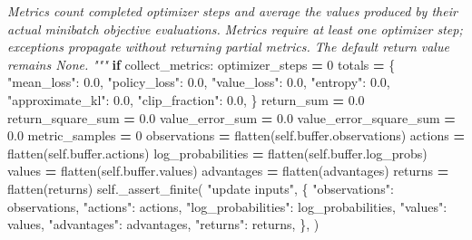 \documentclass[
  american,
  11pt,
  letterpaper,
]{article}
\newenvironment{Shaded}{\begin{snugshade}}{\end{snugshade}}
\newcommand{\BuiltInTok}[1]{#1}
\newcommand{\CommentTok}[1]{\textcolor[rgb]{0.56,0.35,0.01}{\textit{#1}}}
\newcommand{\ControlFlowTok}[1]{\textcolor[rgb]{0.13,0.29,0.53}{\textbf{#1}}}
\newcommand{\DecValTok}[1]{\textcolor[rgb]{0.00,0.00,0.81}{#1}}
\newcommand{\FloatTok}[1]{\textcolor[rgb]{0.00,0.00,0.81}{#1}}
\newcommand{\NormalTok}[1]{#1}
\newcommand{\OperatorTok}[1]{\textcolor[rgb]{0.81,0.36,0.00}{\textbf{#1}}}
\newcommand{\StringTok}[1]{\textcolor[rgb]{0.31,0.60,0.02}{#1}}
\newcommand{\VariableTok}[1]{\textcolor[rgb]{0.00,0.00,0.00}{#1}}
\renewenvironment{Shaded}{\par\smallskip}{\par\smallskip}
\begin{document}
\begin{Shaded}
\begin{Highlighting}[]
\CommentTok{        Metrics count completed optimizer steps and average the values produced}
\CommentTok{        by their actual minibatch objective evaluations.}
\CommentTok{        Metrics require at least one optimizer step; exceptions propagate without}
\CommentTok{        returning partial metrics. The default return value remains \textasciigrave{}\textasciigrave{}None\textasciigrave{}\textasciigrave{}.}
\CommentTok{        """}
        \ControlFlowTok{if}\NormalTok{ collect\_metrics:}
\NormalTok{            optimizer\_steps }\OperatorTok{=} \DecValTok{0}
\NormalTok{            totals }\OperatorTok{=}\NormalTok{ \{}
                \StringTok{"mean\_loss"}\NormalTok{: }\FloatTok{0.0}\NormalTok{,}
                \StringTok{"policy\_loss"}\NormalTok{: }\FloatTok{0.0}\NormalTok{,}
                \StringTok{"value\_loss"}\NormalTok{: }\FloatTok{0.0}\NormalTok{,}
                \StringTok{"entropy"}\NormalTok{: }\FloatTok{0.0}\NormalTok{,}
                \StringTok{"approximate\_kl"}\NormalTok{: }\FloatTok{0.0}\NormalTok{,}
                \StringTok{"clip\_fraction"}\NormalTok{: }\FloatTok{0.0}\NormalTok{,}
\NormalTok{            \}}
\NormalTok{            return\_sum }\OperatorTok{=} \FloatTok{0.0}
\NormalTok{            return\_square\_sum }\OperatorTok{=} \FloatTok{0.0}
\NormalTok{            value\_error\_sum }\OperatorTok{=} \FloatTok{0.0}
\NormalTok{            value\_error\_square\_sum }\OperatorTok{=} \FloatTok{0.0}
\NormalTok{            metric\_samples }\OperatorTok{=} \DecValTok{0}
\NormalTok{        observations }\OperatorTok{=}\NormalTok{ flatten(}\VariableTok{self}\NormalTok{.}\BuiltInTok{buffer}\NormalTok{.observations)}
\NormalTok{        actions }\OperatorTok{=}\NormalTok{ flatten(}\VariableTok{self}\NormalTok{.}\BuiltInTok{buffer}\NormalTok{.actions)}
\NormalTok{        log\_probabilities }\OperatorTok{=}\NormalTok{ flatten(}\VariableTok{self}\NormalTok{.}\BuiltInTok{buffer}\NormalTok{.log\_probs)}
\NormalTok{        values }\OperatorTok{=}\NormalTok{ flatten(}\VariableTok{self}\NormalTok{.}\BuiltInTok{buffer}\NormalTok{.values)}
\NormalTok{        advantages }\OperatorTok{=}\NormalTok{ flatten(advantages)}
\NormalTok{        returns }\OperatorTok{=}\NormalTok{ flatten(returns)}
        \VariableTok{self}\NormalTok{.\_assert\_finite(}
            \StringTok{"update inputs"}\NormalTok{,}
\NormalTok{            \{}
                \StringTok{"observations"}\NormalTok{: observations,}
                \StringTok{"actions"}\NormalTok{: actions,}
                \StringTok{"log\_probabilities"}\NormalTok{: log\_probabilities,}
                \StringTok{"values"}\NormalTok{: values,}
                \StringTok{"advantages"}\NormalTok{: advantages,}
                \StringTok{"returns"}\NormalTok{: returns,}
\NormalTok{            \},}
\NormalTok{        )}


\end{Highlighting}
\end{Shaded}
\end{document}
